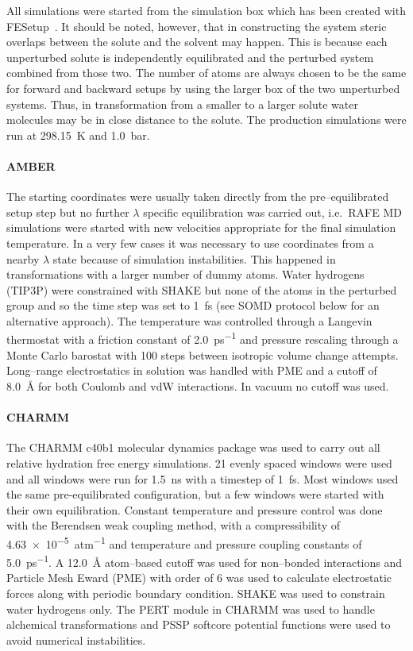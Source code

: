\documentclass[journal=jctcce,manuscript=article]{achemso}
\begin{document}
All simulations were started from the simulation box which has been 
created with FESetup~\cite{loeffler_fesetup:_2015}.  It should be noted, 
however, that in constructing the system steric overlaps between the solute and 
the solvent may happen.  This is because each unperturbed solute is 
independently equilibrated and the perturbed system combined from those two.  
The number of atoms are always chosen to be the same for forward and backward 
setups by using the larger box of the two unperturbed systems.  Thus, in 
transformation from a smaller to a larger solute water molecules may be in 
close distance to the solute.  The production simulations were run at 
\SI{298.15}{K} and \SI{1.0}{bar}.

\paragraph{AMBER} The starting coordinates were usually taken directly from the
pre--equilibrated setup step but no further $\lambda$ specific equilibration 
was carried out, i.e.\ RAFE MD simulations were started with new velocities 
appropriate for the  final simulation temperature.  In a very few cases it was necessary to use coordinates from a nearby $\lambda$ state because of simulation instabilities.  This happened in transformations with a larger number of dummy atoms.  Water hydrogens (TIP3P) were constrained with SHAKE but none of the atoms in the perturbed group and so the time step was set to \SI{1}{fs} (see SOMD protocol below for an alternative approach).  The temperature was controlled through a Langevin thermostat with a friction constant of \SI{2.0}{ps^{-1}} and pressure rescaling through a Monte Carlo barostat with 100 steps between isotropic volume change attempts.  Long--range electrostatics in solution was handled with PME and a cutoff of \SI{8.0}{\angstrom} for both Coulomb and vdW interactions.  In vacuum no cutoff was used.

\paragraph{CHARMM} The CHARMM c40b1 molecular dynamics package was used to 
carry out all relative hydration free energy simulations.  21 evenly spaced 
windows were used and all windows were run for \SI{1.5}{ns} with a timestep of 
\SI{1}{fs}.  Most windows used the same pre-equilibrated configuration, but a 
few windows were started with their own equilibration. 
 Constant temperature and pressure control was done with the Berendsen weak coupling method, with a 
compressibility of \SI{4.63e-5}{atm^{-1}} and temperature and pressure coupling 
constants of \SI{5.0}{ps^{-1}}.  A \SI{12.0}{\angstrom} atom--based cutoff was 
used for non--bonded interactions and Particle Mesh Eward (PME) with order of 6 
was used to calculate electrostatic forces along with periodic boundary 
condition.  SHAKE was used to constrain water hydrogens only.  The PERT module 
in CHARMM was used to handle alchemical transformations and PSSP 
softcore potential functions were used to avoid numerical instabilities.
\end{document}
